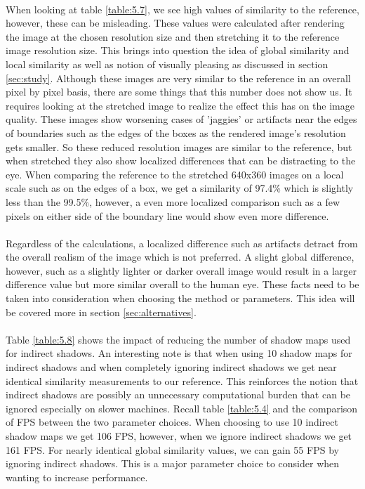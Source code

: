 \paragraph{}
When looking at table \ref{table:5.7}, we see high values of similarity to the reference, however, these can be misleading.  These values were calculated after rendering the image at the chosen resolution size and then stretching it to the reference image resolution size.  This brings into question the idea of global similarity and local similarity as well as notion of visually pleasing as discussed in section \ref{sec:study}.  Although these images are very similar to the reference in an overall pixel by pixel basis, there are some things that this number does not show us.  It requires looking at the stretched image to realize the effect this has on the image quality.  These images show worsening cases of 'jaggies' or artifacts near the edges of boundaries such as the edges of the boxes as the rendered image's resolution gets smaller.  So these reduced resolution images are similar to the reference, but when stretched they also show localized differences that can be distracting to the eye.  When comparing the reference to the stretched 640x360 images on a local scale such as on the edges of a box, we get a similarity of 97.4\% which is slightly less than the 99.5\%, however, a even more localized comparison such as a few pixels on either side of the boundary line would show even more difference.

\paragraph{}
Regardless of the calculations, a localized difference such as artifacts detract from the overall realism of the image which is not preferred.  A slight global difference, however, such as a slightly lighter or darker overall image would result in a larger difference value but more similar overall to the human eye.  These facts need to be taken into consideration when choosing the method or parameters.  This idea will be covered more in section \ref{sec:alternatives}.

\paragraph{}
Table \ref{table:5.8} shows the impact of reducing the number of shadow maps used for indirect shadows.  An interesting note is that when using 10 shadow maps for indirect shadows and when completely ignoring indirect shadows we get near identical similarity measurements to our reference.  This reinforces the notion that indirect shadows are possibly an unnecessary computational burden that can be ignored especially on slower machines.  Recall table \ref{table:5.4} and the comparison of FPS between the two parameter choices.  When choosing to use 10 indirect shadow maps we get 106 FPS, however, when we ignore indirect shadows we get 161 FPS.  For nearly identical global similarity values, we can gain 55 FPS by ignoring indirect shadows.  This is a major parameter choice to consider when wanting to increase performance.

